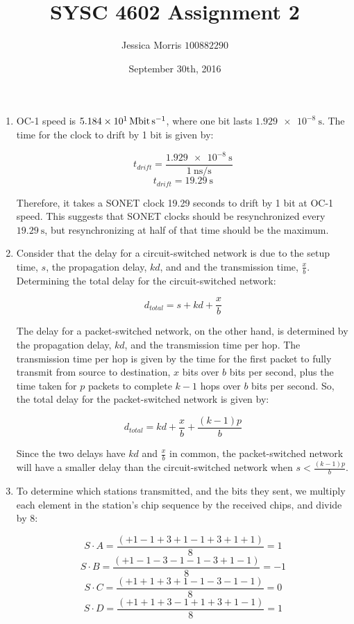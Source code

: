\documentclass{article}
\title{SYSC 4602 Assignment 2}
\date{September 30th, 2016}
\author{Jessica Morris \(100882290\)}
\begin{document}
\maketitle

\begin{enumerate}

\item OC-1 speed is $ \SI{51.84}{\mega\bit\per\second} $, where one bit lasts $ \SI{1.929e-8}{\second} $. The time for the clock to drift by 1 bit is given by:

$$ t_{drift} = \frac{\SI{1.929e-8}{\second}}{\SI{1}{\nano\second\per\second}}$$
$$ t_{drift} = \SI{19.29}{\second} $$

Therefore, it takes a SONET clock 19.29 seconds to drift by 1 bit at OC-1 speed. This suggests that SONET clocks should be resynchronized every $ \SI{19.29}{\second} $, but resynchronizing at half of that time should be the maximum.

\item Consider that the delay for a circuit-switched network is due to the setup time, $s$, the propagation delay, $kd$, and and the transmission time, $\frac{x}{b}$. Determining the total delay for the circuit-switched network:

$$ d_{total} = s + kd + \frac{x}{b} $$

The delay for a packet-switched network, on the other hand, is determined by the propagation delay, $kd$, and the transmission time per hop. The transmission time per hop is given by the time for the first packet to fully transmit from source to destination, $x$ bits over $b$ bits per second, plus the time taken for $p$ packets to complete $k-1$ hops over $b$ bits per second. So, the total delay for the packet-switched network is given by:

$$ d_{total} = kd + \frac{x}{b} + \frac{(k-1)p}{b} $$

Since the two delays have $kd$ and $\frac{x}{b}$ in common, the packet-switched network will have a smaller delay than the circuit-switched network when $s < \frac{(k-1)p}{b}$.

\item To determine which stations transmitted, and the bits they sent, we multiply each element in the station's chip sequence by the received chips, and divide by 8:

$$ S \cdot A = \frac{(+1 -1 +3 +1 -1 +3 +1 +1)}{8} = 1 $$
$$ S \cdot B = \frac{(+1 -1 -3 -1 -1 -3 +1 -1)}{8} = -1 $$
$$ S \cdot C = \frac{(+1 +1 +3 +1 -1 -3 -1 -1)}{8} = 0 $$
$$ S \cdot D = \frac{(+1 +1 +3 -1 +1 +3 +1 -1)}{8} = 1 $$


\end{enumerate}
\end{document}
